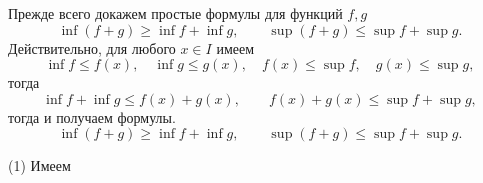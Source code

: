  Прежде всего докажем простые формулы для функций $f,g$
\[
 \inf (f+g) \ge \inf f + \inf g, \qquad \sup(f+g) \le \sup f + \sup g.
\]
Действительно, для любого $x\in I$ имеем
\[
 \inf f \le f(x), \quad \inf g \le g(x), \quad f(x) \le \sup f, \quad g(x) \le \sup g,
\]
тогда
\[
 \inf f + \inf g \le f(x) + g(x), \qquad f(x) + g(x) \le \sup f + \sup g,
\]
тогда и получаем формулы.
\[
 \inf (f+g) \ge \inf f + \inf g, \qquad \sup(f+g) \le \sup f + \sup g.
\]

(1) Имеем